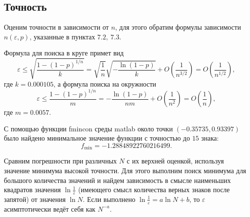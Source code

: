 \documentclass[12pt, a4paper]{article}
\begin{document}
\subsection*{Точность}
Оценим точности в зависимости от $n$, для этого обратим формулы зависимости $n(\varepsilon,p)$, указанные в пунктах $7.2,\ 7.3$. 

Формула для поиска в круге примет вид
\[ \varepsilon \leqslant \sqrt{\frac{1-(1-p)^{1/n}}{k}} = \sqrt{\frac{1}{n}}\sqrt{-\frac{\ln(1-p)}{k}} + O\left(\frac{1}{n^{3/2}}\right) = O\left(\frac{1}{n^{1/2}}\right), \]
где $k = 0.000105$, а формула поиска на окружности
\[\varepsilon \leqslant \frac{1-(1-p)^{1/n}}{m} = -\frac{\ln(1-p)}{nm}+O\left( \frac 1{n^2} \right) = O \left( \frac 1n \right),\]
где $m=0.0057$.

С помощью функции fmincon среды matlab около точки $(-0.35735, 0.93397)$ было найдено минимальное значение функции с точностью до $15$ знака: \[f_{\min} =-1.28848922760216499.\] 

Сравним погрешности при различных $N$ с их верхней оценкой, используя значение минимума высокой точности. Для этого выполним поиск минимума для большого количества значений и найдем зависимость в смысле наименьших квадратов значения $\ln{\frac 1\varepsilon}$ (имеющего смысл количества верных знаков после запятой) от значения $\ln N$. Если выполнено $\ln{\frac 1\varepsilon} = a\ln N + b$, то $\varepsilon$ асимптотически ведёт себя как $N^{-a}$.
\end{document}
